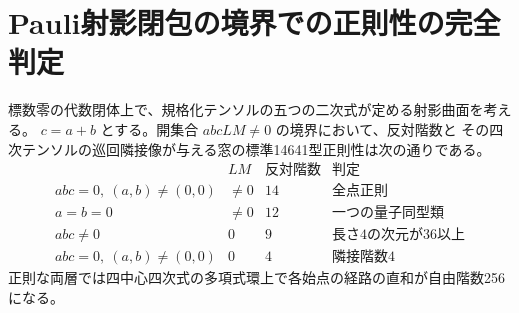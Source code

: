 \section{Pauli射影閉包の境界での正則性の完全判定}
\label{sec:pauli-projective-boundary}
\begin{theorem}\label{thm:pauli-projective-boundary}
標数零の代数閉体上で、規格化テンソルの五つの二次式が定める射影曲面を考える。
$c=a+b$ とする。開集合 $abcLM\ne0$ の境界において、反対階数と
その四次テンソルの巡回隣接像が与える窓の標準14641型正則性は次の通りである。
\[
\begin{array}{c|c|c|l}
 & LM &\text{反対階数}&\text{判定}\\\hline
 abc=0,\ (a,b)\ne(0,0)&\ne0&14&\text{全点正則}\\
 a=b=0 &\ne0&12&\text{一つの量子同型類}\\
 abc\ne0&0&9&\text{長さ4の次元が36以上}\\
 abc=0,\ (a,b)\ne(0,0)&0&4&\text{隣接階数4}
\end{array}
\]
正則な両層では四中心四次式の多項式環上で各始点の経路の直和が自由階数256になる。
\end{theorem}
